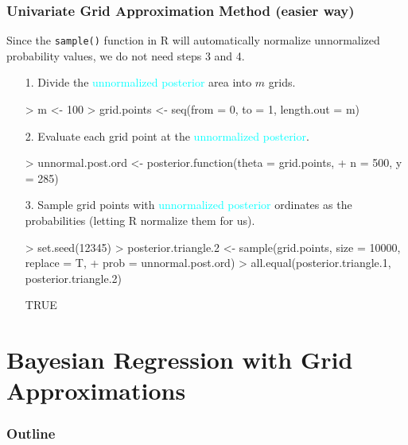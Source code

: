 \documentclass{beamer}
\begin{document}
\begin{frame}[fragile]
\frametitle{Univariate Grid Approximation Method (easier way)}
\pause

Since the {\tt sample()} function in R will automatically normalize
unnormalized probability values, we do not need steps 3 and 4.
\bigskip
\pause
\begin{itemize}
\item[1.] Divide the \textcolor{cyan}{unnormalized posterior} area into $m$ grids.
\pause
\medskip
\tiny
\begin{Schunk}
\begin{Sinput}
> m <- 100
> grid.points <- seq(from = 0, to = 1, length.out = m)
\end{Sinput}
\end{Schunk}
\bigskip
\normalsize
\pause
\item[2.] Evaluate each grid point at the \textcolor{cyan}{unnormalized posterior}.
\pause
\medskip
\tiny
\begin{Schunk}
\begin{Sinput}
> unnormal.post.ord <- posterior.function(theta = grid.points, 
+     n = 500, y = 285)
\end{Sinput}
\end{Schunk}
\bigskip
\pause
\normalsize
\item[3.] Sample grid points with \textcolor{cyan}{unnormalized posterior} ordinates as
the probabilities (letting R normalize them for us).
\medskip
\pause
\tiny
\begin{Schunk}
\begin{Sinput}
> set.seed(12345)
> posterior.triangle.2 <- sample(grid.points, size = 10000, replace = T, 
+     prob = unnormal.post.ord)
> all.equal(posterior.triangle.1, posterior.triangle.2)
\end{Sinput}
\begin{Soutput}
[1] TRUE
\end{Soutput}
\end{Schunk}
\end{itemize}
\end{frame}


\section{Bayesian Regression with Grid Approximations}

\begin{frame}
\frametitle{Outline}
\tableofcontents[currentsection]
\end{frame}
\end{document}
